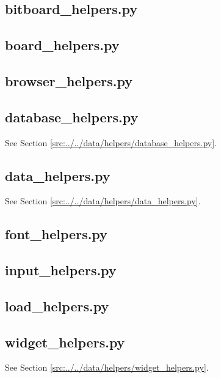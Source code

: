 \documentclass[../main/main.tex]{subfiles}
\begin{document}
\subsection{bitboard\_helpers.py}

\label{src:data/helpers/bitboard_helpers.py}

\subsection{board\_helpers.py}

\label{src:data/helpers/board_helpers.py}

\subsection{browser\_helpers.py}

\label{src:data/helpers/browser_helpers.py}

\subsection{database\_helpers.py}
See Section \ref{src:../../data/helpers/database_helpers.py}.

\subsection{data\_helpers.py}
See Section \ref{src:../../data/helpers/data_helpers.py}.

\subsection{font\_helpers.py}

\label{src:data/helpers/font_helpers.py}

\subsection{input\_helpers.py}

\label{src:data/helpers/input_helpers.py}

\subsection{load\_helpers.py}

\label{src:data/helpers/load_helpers.py}

\subsection{widget\_helpers.py}
See Section \ref{src:../../data/helpers/widget_helpers.py}.
\end{document}
